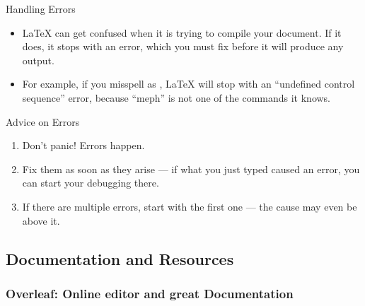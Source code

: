 \begin{frame}[fragile]{Handling Errors}
    \begin{itemize}
        \item \LaTeX{} can get confused when it is trying to compile your document. If
              it does, it stops with an error, which you must fix before it will produce
              any output.
        \item For example, if you misspell  as , \LaTeX{} will
              stop with an ``undefined control sequence'' error, because ``meph'' is not
              one of the commands it knows.
    \end{itemize}
    \begin{block}{Advice on Errors}
        \begin{enumerate}
            \item Don't panic! Errors happen.
            \item Fix them as soon as they arise --- if what you just typed caused an error,
                  you can start your debugging there.
            \item If there are multiple errors, start with the first one --- the cause may
                  even be above it.
        \end{enumerate}
    \end{block}
\end{frame}

\subsection{Documentation and Resources}

\begin{frame}
    \frametitle{Overleaf: Online editor and great Documentation}

      

\end{frame}